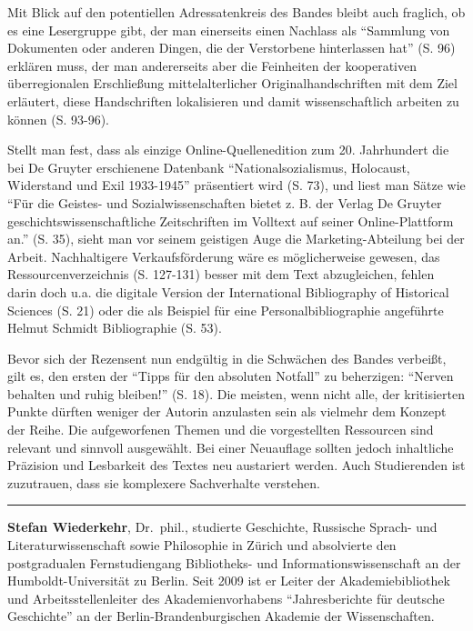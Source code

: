 \documentclass[a4paper,
fontsize=11pt,
oneside,
numbers=noperiodatend,
parskip=half-,
bibliography=totoc,
final
]{scrartcl}
\begin{document}
Mit Blick auf den potentiellen Adressatenkreis des Bandes bleibt auch
fraglich, ob es eine Lesergruppe gibt, der man einerseits einen Nachlass
als \enquote{Sammlung von Dokumenten oder anderen Dingen, die der
Verstorbene hinterlassen hat} (S. 96) erklären muss, der man
andererseits aber die Feinheiten der kooperativen überregionalen
Erschließung mittelalterlicher Originalhandschriften mit dem Ziel
erläutert, diese Handschriften lokalisieren und damit wissenschaftlich
arbeiten zu können (S. 93-96).

Stellt man fest, dass als einzige Online-Quellenedition zum 20.
Jahrhundert die bei De Gruyter erschienene Datenbank
\enquote{Nationalsozialismus, Holocaust, Widerstand und Exil 1933-1945}
präsentiert wird (S. 73), und liest man Sätze wie \enquote{Für die
Geistes- und Sozialwissenschaften bietet z. B. der Verlag De Gruyter
geschichtswissenschaftliche Zeitschriften im Volltext auf seiner
Online-Plattform an.} (S. 35), sieht man vor seinem geistigen Auge die
Marketing-Abteilung bei der Arbeit. Nachhaltigere Verkaufsförderung wäre
es möglicherweise gewesen, das Ressourcenverzeichnis (S. 127-131) besser
mit dem Text abzugleichen, fehlen darin doch u.a. die digitale Version
der International Bibliography of Historical Sciences (S. 21) oder die
als Beispiel für eine Personalbibliographie angeführte Helmut Schmidt
Bibliographie (S. 53).

Bevor sich der Rezensent nun endgültig in die Schwächen des Bandes
verbeißt, gilt es, den ersten der \enquote{Tipps für den absoluten
Notfall} zu beherzigen: \enquote{Nerven behalten und ruhig bleiben!} (S.
18). Die meisten, wenn nicht alle, der kritisierten Punkte dürften
weniger der Autorin anzulasten sein als vielmehr dem Konzept der Reihe.
Die aufgeworfenen Themen und die vorgestellten Ressourcen sind relevant
und sinnvoll ausgewählt. Bei einer Neuauflage sollten jedoch inhaltliche
Präzision und Lesbarkeit des Textes neu austariert werden. Auch
Studierenden ist zuzutrauen, dass sie komplexere Sachverhalte verstehen.

\begin{center}\rule{3in}{0.4pt}\end{center}

\textbf{Stefan Wiederkehr}, Dr.~phil., studierte Geschichte, Russische
Sprach- und Literaturwissenschaft sowie Philosophie in Zürich und
absolvierte den postgradualen Fernstudiengang Bibliotheks- und
Informationswissenschaft an der Humboldt-Universität zu Berlin. Seit
2009 ist er Leiter der Akademiebibliothek und Arbeitsstellenleiter des
Akademienvorhabens \enquote{Jahresberichte für deutsche Geschichte} an
der Berlin-Brandenburgischen Akademie der Wissenschaften.
\end{document}
